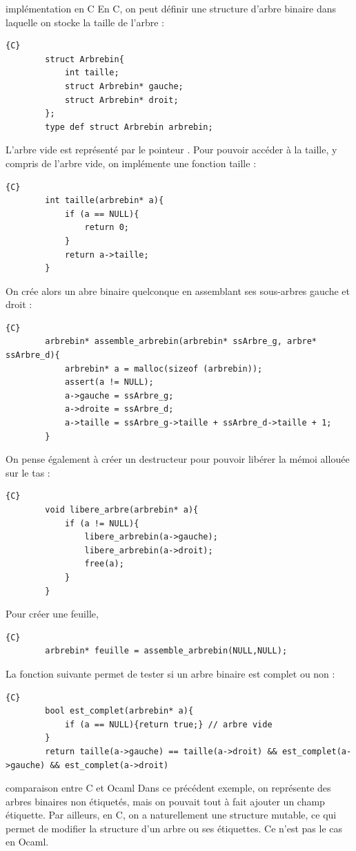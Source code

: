 \begin{exemple}{7.11}{implémentation en C}
    En C, on peut définir une structure d'arbre binaire dans laquelle on stocke la taille de l'arbre :
    \begin{verbatim}{C}
        struct Arbrebin{
            int taille;
            struct Arbrebin* gauche;
            struct Arbrebin* droit;
        };
        type def struct Arbrebin arbrebin;
    \end{verbatim}
    L'arbre vide est représenté par le pointeur . Pour pouvoir accéder à la taille, y compris de l'arbre vide, on implémente une fonction taille : 
    \begin{verbatim}{C}
        int taille(arbrebin* a){
            if (a == NULL){
                return 0;
            }
            return a->taille;
        }
    \end{verbatim}
    On crée alors un abre binaire quelconque en assemblant ses sous-arbres gauche et droit : 
    \begin{verbatim}{C}
        arbrebin* assemble_arbrebin(arbrebin* ssArbre_g, arbre* ssArbre_d){
            arbrebin* a = malloc(sizeof (arbrebin));
            assert(a != NULL);
            a->gauche = ssArbre_g;
            a->droite = ssArbre_d;
            a->taille = ssArbre_g->taille + ssArbre_d->taille + 1;
        }
    \end{verbatim}
    On pense également à créer un destructeur pour pouvoir libérer la mémoi allouée sur le tas : 
    \begin{verbatim}{C}
        void libere_arbre(arbrebin* a){
            if (a != NULL){
                libere_arbrebin(a->gauche);
                libere_arbrebin(a->droit);
                free(a);
            }
        }
    \end{verbatim}
    Pour créer une feuille,
    \begin{verbatim}{C}
        arbrebin* feuille = assemble_arbrebin(NULL,NULL);
    \end{verbatim}
    La fonction suivante permet de tester si un arbre binaire est complet ou non : 
    \begin{verbatim}{C}
        bool est_complet(arbrebin* a){
            if (a == NULL){return true;} // arbre vide
        }
        return taille(a->gauche) == taille(a->droit) && est_complet(a->gauche) && est_complet(a->droit)
    \end{verbatim}
\end{exemple}

\begin{remarque}{7.12}{comparaison entre C et Ocaml}
    Dans ce précédent exemple, on représente des arbres binaires non étiquetés, mais on pouvait tout à fait ajouter un champ étiquette. Par ailleurs, en C, on a naturellement une structure mutable, ce qui permet de modifier la structure d'un arbre ou ses étiquettes. Ce n'est pas le cas en Ocaml.
\end{remarque}

